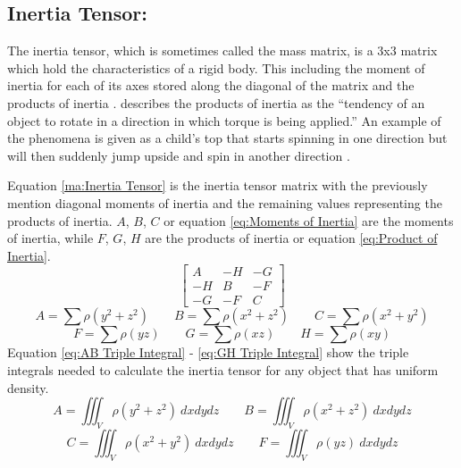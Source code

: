 \subsection{Inertia Tensor:}\label{sc:IT}
The inertia tensor, which is sometimes called the mass matrix, is a 3x3 matrix which hold the characteristics of a rigid body.
This including the moment of inertia for each of its axes stored along the diagonal of the matrix and the products of inertia \citep{millington2007game}.
\citet{millington2007game} describes the products of inertia as the “tendency of an object to rotate in a direction in which torque is being applied.”
An example of the phenomena is given as a child's top that starts spinning in one direction but will then suddenly jump upside and spin in another direction \citep{millington2007game}. 

Equation \ref{ma:Inertia Tensor} is the inertia tensor matrix with the previously mention diagonal moments of inertia and the remaining values representing the products of inertia.
$A$, $B$, $C$ or equation \ref{eq:Moments of Inertia} are the moments of inertia, while $F$, $G$, $H$ are the products of inertia or equation \ref{eq:Product of Inertia}. 
\begin{equation}\label{ma:Inertia Tensor}
	\begin{bmatrix}
	  A & -H & -G \\
	  -H & B & -F \\
	  -G & -F & C
	\end{bmatrix}
\end{equation}
\begin{equation}\label{eq:Moments of Inertia}
	A=\sum\rho\left({y}^{2}+{z}^{2}\right)
	\qquad
	B=\sum\rho\left({x}^{2}+{z}^{2}\right)
	\qquad
	C=\sum\rho\left({x}^{2}+{y}^{2}\right)
\end{equation}
\begin{equation}\label{eq:Product of Inertia}
	F=\sum\rho\left(yz\right)
	\qquad
	G=\sum\rho\left(xz\right)
	\qquad
	H=\sum\rho\left(xy\right)
\end{equation}
Equation \ref{eq:AB Triple Integral} - \ref{eq:GH Triple Integral} show the triple integrals needed to calculate the inertia tensor for any object that has uniform density. 
\begin{equation}\label{eq:AB Triple Integral}
	A=\iiint_{V} \rho({y}^{2}+{z}^{2})\  dx dy dz
	\qquad
	B=\iiint_{V} \rho({x}^{2}+{z}^{2})\ dx dy dz
\end{equation}
\begin{equation}\label{eq:CF Triple Integral}
	C=\iiint_{V} \rho({x}^{2}+{y}^{2})\ dx dy dz
	\qquad
	F=\iiint_{V} \rho(yz)\ dx dy dz
\end{equation}
